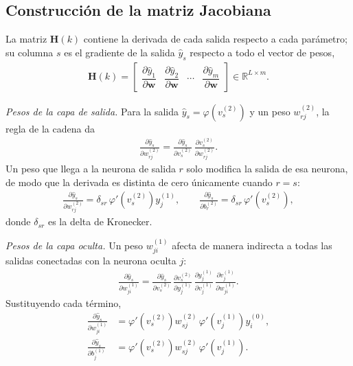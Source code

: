 \documentclass[conference]{IEEEtran}
\begin{document}
\subsection{Construcción de la matriz Jacobiana}
La matriz $\mathbf{H}(k)$ contiene la derivada de cada salida respecto a
cada parámetro; su columna $s$ es el gradiente de la salida
$\widehat{y}_s$ respecto a todo el vector de pesos,
\begin{align}
    \label{eq:H}
    \mathbf{H}(k)=
    \begin{bmatrix}
    \dfrac{\partial\widehat{y}_1}{\partial\mathbf{w}} & \dfrac{\partial\widehat{y}_2}{\partial\mathbf{w}} & \cdots & \dfrac{\partial\widehat{y}_m}{\partial\mathbf{w}}
    \end{bmatrix}\in\mathbb{R}^{L\times m}.
\end{align}

\textit{Pesos de la capa de salida.} Para la salida
$\widehat{y}_s=\varphi\!\left(v_s^{(2)}\right)$ y un peso $w_{rj}^{(2)}$, la
regla de la cadena da
\begin{align}
    \label{eq:cadena2}
    \frac{\partial\widehat{y}_s}{\partial w_{rj}^{(2)}}
    =\frac{\partial\widehat{y}_s}{\partial v_s^{(2)}}\,
     \frac{\partial v_s^{(2)}}{\partial w_{rj}^{(2)}}.
\end{align}
Un peso que llega a la neurona de salida $r$ solo modifica la salida de esa
neurona, de modo que la derivada es distinta de cero únicamente cuando
$r=s$:
\begin{align}
    \label{eq:dsalida}
    \frac{\partial\widehat{y}_s}{\partial w_{rj}^{(2)}}
    =\delta_{sr}\,\varphi'\!\left(v_s^{(2)}\right)y_j^{(1)},\qquad
    \frac{\partial\widehat{y}_s}{\partial b_{r}^{(2)}}
    =\delta_{sr}\,\varphi'\!\left(v_s^{(2)}\right),
\end{align}
donde $\delta_{sr}$ es la delta de Kronecker.

\textit{Pesos de la capa oculta.} Un peso $w_{ji}^{(1)}$ afecta de manera
indirecta a todas las salidas conectadas con la neurona oculta $j$:
\begin{align}
    \label{eq:cadena1}
    \frac{\partial\widehat{y}_s}{\partial w_{ji}^{(1)}}
    =\frac{\partial\widehat{y}_s}{\partial v_s^{(2)}}\,
     \frac{\partial v_s^{(2)}}{\partial y_j^{(1)}}\,
     \frac{\partial y_j^{(1)}}{\partial v_j^{(1)}}\,
     \frac{\partial v_j^{(1)}}{\partial w_{ji}^{(1)}}.
\end{align}
Sustituyendo cada término,
\begin{align}
    \label{eq:doculta}
    \frac{\partial\widehat{y}_s}{\partial w_{ji}^{(1)}}
    &=\varphi'\!\left(v_s^{(2)}\right)w_{sj}^{(2)}\,\varphi'\!\left(v_j^{(1)}\right)y_i^{(0)},\\
    \label{eq:dbias1}
    \frac{\partial\widehat{y}_s}{\partial b_{j}^{(1)}}
    &=\varphi'\!\left(v_s^{(2)}\right)w_{sj}^{(2)}\,\varphi'\!\left(v_j^{(1)}\right).
\end{align}
\end{document}
